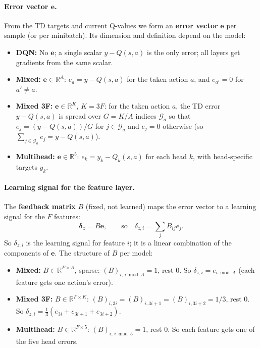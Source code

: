 \documentclass[11pt]{article}
\begin{document}
\paragraph{Error vector $\mathbf{e}$.} From the TD targets and current Q-values we form an \textbf{error vector} $\mathbf{e}$ per sample (or per minibatch). Its dimension and definition depend on the model:
\begin{itemize}
\item \textbf{DQN:} No $\mathbf{e}$; a single scalar $y - Q(s,a)$ is the only error; all layers get gradients from the same scalar.
\item \textbf{Mixed:} $\mathbf{e} \in \mathbb{R}^A$: $e_a = y - Q(s,a)$ for the taken action $a$, and $e_{a'} = 0$ for $a' \neq a$.
\item \textbf{Mixed 3F:} $\mathbf{e} \in \mathbb{R}^K$, $K = 3F$: for the taken action $a$, the TD error $y - Q(s,a)$ is spread over $G = K/A$ indices $\mathcal{G}_a$ so that $e_j = (y - Q(s,a))/G$ for $j \in \mathcal{G}_a$ and $e_j = 0$ otherwise (so $\sum_{j \in \mathcal{G}_a} e_j = y - Q(s,a)$).
\item \textbf{Multihead:} $\mathbf{e} \in \mathbb{R}^5$: $e_k = y_k - Q_k(s,a)$ for each head $k$, with head-specific targets $y_k$.
\end{itemize}

\paragraph{Learning signal for the feature layer.} The \textbf{feedback matrix} $B$ (fixed, not learned) maps the error vector to a learning signal for the $F$ features:
\begin{equation}
\boldsymbol{\delta}_z = B \mathbf{e}, \qquad \text{so} \quad \delta_{z,i} = \sum_j B_{ij} e_j.
\end{equation}
So $\delta_{z,i}$ is the learning signal for feature $i$; it is a linear combination of the components of $\mathbf{e}$. The structure of $B$ per model:
\begin{itemize}
\item \textbf{Mixed:} $B \in \mathbb{R}^{F \times A}$, sparse: $(B)_{i,\, i \bmod A} = 1$, rest 0. So $\delta_{z,i} = e_{i \bmod A}$ (each feature gets one action's error).
\item \textbf{Mixed 3F:} $B \in \mathbb{R}^{F \times K}$: $(B)_{i,3i} = (B)_{i,3i+1} = (B)_{i,3i+2} = 1/3$, rest 0. So $\delta_{z,i} = \frac{1}{3}(e_{3i} + e_{3i+1} + e_{3i+2})$.
\item \textbf{Multihead:} $B \in \mathbb{R}^{F \times 5}$: $(B)_{i,\, i \bmod 5} = 1$, rest 0. So each feature gets one of the five head errors.
\end{itemize}
\end{document}
